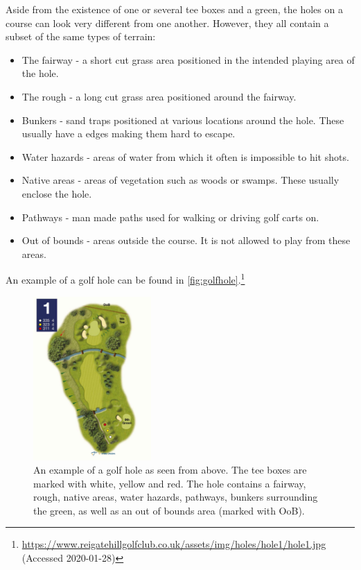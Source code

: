 \documentclass{kththesis}
\begin{document}
Aside from the existence of one or several tee boxes and a green, the holes on a course can look very different from one another. However, they all contain a subset of the same types of terrain:
\begin{itemize}
    \item The fairway - a short cut grass area positioned in the intended playing area of the hole. 
    \item The rough - a long cut grass area positioned around the fairway.
    \item Bunkers - sand traps positioned at various locations around the hole. These usually have a edges making them hard to escape.
    \item Water hazards - areas of water from which it often is impossible to hit shots.
    \item Native areas - areas of vegetation such as woods or swamps. These usually enclose the hole.
    \item Pathways - man made paths used for walking or driving golf carts on.
    \item Out of bounds - areas outside the course. It is not allowed to play from these areas.
\end{itemize}
An example of a golf hole can be found in \autoref{fig:golfhole}.\footnote{\url{https://www.reigatehillgolfclub.co.uk/assets/img/holes/hole1/hole1.jpg} (Accessed 2020-01-28)}

\begin{figure}
    \centering
    \includegraphics[width=0.4\textwidth]{golfhole.jpg}
    \caption{An example of a golf hole as seen from above. The tee boxes are marked with white, yellow and red. The hole contains a fairway, rough, native areas, water hazards, pathways, bunkers surrounding the green, as well as an out of bounds area (marked with OoB).}
    \label{fig:golfhole}
\end{figure}
\end{document}
